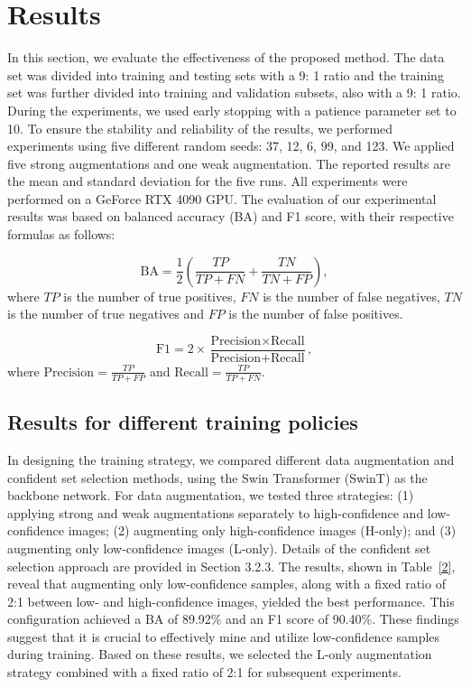 \documentclass[preprint,12pt,authoryear]{elsarticle}
\begin{document}
\section{Results}
In this section, we evaluate the effectiveness of the proposed method. The data set was divided into training and testing sets with a 9: 1 ratio and the training set was further divided into training and validation subsets, also with a 9: 1 ratio. During the experiments, we used early stopping with a patience parameter set to 10. To ensure the stability and reliability of the results, we performed experiments using five different random seeds: 37, 12, 6, 99, and 123. We applied five strong augmentations and one weak augmentation. The reported results are the mean and standard deviation for the five runs. All experiments were performed on a GeForce RTX 4090 GPU. The evaluation of our experimental results was based on balanced accuracy (BA) and F1 score, with their respective formulas as follows:

\begin{equation}
\text{BA} = \frac{1}{2} \left( \frac{TP}{TP + FN} + \frac{TN}{TN + FP} \right),
\end{equation}
where \( TP \) is the number of true positives, \( FN \) is the number of false negatives, \( TN \) is the number of true negatives and \( FP \) is the number of false positives.

\begin{equation}
\text{F1} = 2 \times \frac{\text{Precision} \times \text{Recall}}{\text{Precision} + \text{Recall}},
\end{equation}
where \(\text{Precision} = \frac{TP}{TP + FP}\) and \(\text{Recall} = \frac{TP}{TP + FN}\).


\subsection{Results for different training policies}

In designing the training strategy, we compared different data augmentation and confident set selection methods, using the Swin Transformer (SwinT) as the backbone network. For data augmentation, we tested three strategies: (1) applying strong and weak augmentations separately to high-confidence and low-confidence images; (2) augmenting only high-confidence images (H-only); and (3) augmenting only low-confidence images (L-only). Details of the confident set selection approach are provided in Section 3.2.3. The results, shown in Table~\ref{2}, reveal that augmenting only low-confidence samples, along with a fixed ratio of 2:1 between low- and high-confidence images, yielded the best performance. This configuration achieved a BA of 89.92\% and an F1 score of 90.40\%. These findings suggest that it is crucial to effectively mine and utilize low-confidence samples during training. Based on these results, we selected the L-only augmentation strategy combined with a fixed ratio of 2:1 for subsequent experiments.
\end{document}
